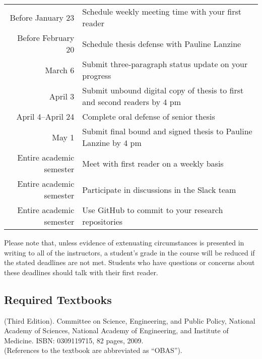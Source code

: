 \documentclass[11pt]{article}
\begin{document}
\begin{center}
\begin{tabular}{r|l}
\hline

Before January 23  & Schedule weekly meeting time with your first reader \\
Before February 20 & Schedule thesis defense with Pauline Lanzine \\
March 6           & Submit three-paragraph status update on your progress \\
April 3            & Submit unbound digital copy of thesis to first and second readers by 4 pm \\
April 4--April 24  & Complete oral defense of senior thesis \\
May 1              & Submit final bound and signed thesis to Pauline Lanzine by 4 pm\\

\hline
Entire academic semester & Meet with first reader on a weekly basis \\
Entire academic semester & Participate in discussions in the Slack team \\
Entire academic semester & Use GitHub to commit to your research repositories \\
\hline
\end{tabular}
\end{center}


\noindent Please note that, unless evidence of extenuating circumstances is
presented in writing to all of the instructors, a student's grade in the course
will be reduced if the stated deadlines are not met. Students who have questions
or concerns about these deadlines should talk with their first reader.

\subsection*{Required Textbooks}

(Third Edition).  Committee on Science, Engineering, and Public Policy, National
Academy of Sciences, National Academy of Engineering, and Institute of Medicine.
ISBN: 0309119715, 82 pages, 2009.\\ (References to the textbook are abbreviated
as ``OBAS'').

\vspace*{.1in}
\end{document}
